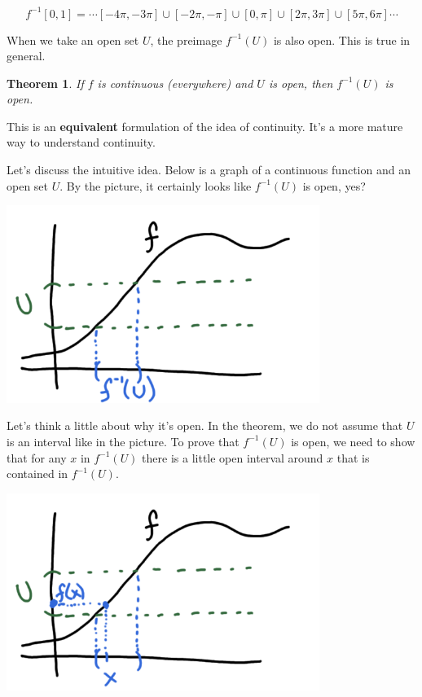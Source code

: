 \documentclass[11pt]{book}
\newtheorem{theorem}{Theorem}
\numberwithin{example}{chapter}
\begin{document}
$$f^{-1}[0,1] = \cdots [-4\pi,-3\pi]\cup [-2\pi,-\pi] \cup  [0,\pi] \cup  [2\pi,3\pi] \cup  [5\pi,6\pi] \cdots $$

When we take an open set $U$, the preimage $f^{-1}(U)$ is also open.  This is true in general.

\begin{theorem}
If $f$ is continuous (everywhere) and $U$ is open, then $f^{-1}(U)$ is open.
\end{theorem}

This is an \textbf{equivalent} formulation of the idea of continuity.  It's a more mature way to understand continuity.  


Let's discuss the intuitive idea.  Below is a graph of a continuous function and an open set $U$.  By the picture, it certainly looks like $f^{-1}(U)$ is open, yes?  

\begin{center}
\includegraphics[width=4in]{toplec1_4.png}
\end{center}

Let's think a little about why it's open.  In the theorem, we do not assume that $U$ is an interval like in the picture.  To prove that $f^{-1}(U)$ is open, we need to show that for any $x$ in $f^{-1}(U)$ there is a little open interval around $x$ that is contained in $f^{-1}(U)$.

\begin{center}
\includegraphics[width=4in]{toplec1_5.png}
\end{center}
\end{document}
